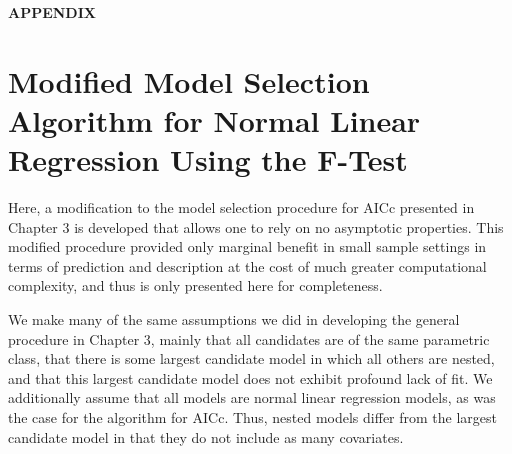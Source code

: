 \renewcommand{\theequation}{A.\arabic{equation}}
\setcounter{equation}{0}
\begin{center}
\textbf{APPENDIX}
\end{center}
\doublespace
\phantom{a}
\phantom{a}
\noindent

\section*{Modified Model Selection Algorithm for Normal Linear Regression Using the F-Test}

Here, a modification to the model selection procedure for AICc presented in Chapter 3 is developed that allows one to rely on no asymptotic properties.
This modified procedure provided only marginal benefit in small sample settings in terms of prediction and description at the cost of much
greater computational complexity, and thus is only presented here for completeness.

We make many of the same assumptions we did in developing the general procedure in Chapter 3, mainly that all candidates are of the same parametric
class, that there is some largest candidate model in which all others are nested, and that this largest candidate model does not exhibit
profound lack of fit. We additionally assume that all models are normal linear regression models, as was the case for the algorithm for
AICc. Thus, nested models differ from the largest candidate model in that they do not include as many covariates.

